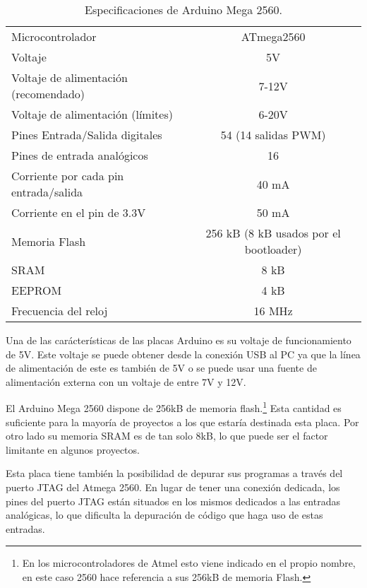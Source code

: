 \begin{table}
\begin{center}
\begin{tabular}{| l | c |}
\hline
Microcontrolador 						& ATmega2560 \\
Voltaje									& 5V \\
Voltaje de alimentación (recomendado) 	& 7-12V \\
Voltaje de alimentación (límites) 		& 6-20V \\
Pines Entrada/Salida digitales			& 54 (14 salidas PWM) \\
Pines de entrada analógicos				& 16 \\
Corriente por cada pin entrada/salida 	& 40 mA \\
Corriente en el pin de 3.3V				& 50 mA \\
Memoria Flash 							& 256 kB (8 kB usados por el bootloader) \\
SRAM									& 8 kB \\
EEPROM									& 4 kB \\
Frecuencia del reloj					& 16 MHz \\
\hline
\end{tabular}
\end{center}
\caption{Especificaciones de Arduino Mega 2560.}
\label{tab:mega2560_specs}
\end{table}
Una de las carácterísticas de las placas Arduino es su voltaje de funcionamiento de 5V. Este voltaje se puede obtener desde la conexión USB al PC ya que la línea de alimentación de este es también de 5V o se puede usar una fuente de alimentación externa con un voltaje de entre 7V y 12V.

El Arduino Mega 2560 dispone de 256kB de memoria flash.\footnote{En los microcontroladores de Atmel esto viene indicado en el propio nombre, en este caso 2560 hace referencia a sus 256kB de memoria Flash.} Esta cantidad es suficiente para la mayoría de proyectos a los que estaría destinada esta placa. Por otro lado su memoria SRAM es de tan solo 8kB, lo que puede ser el factor limitante en algunos proyectos.

Esta placa tiene también la posibilidad de depurar sus programas a través del puerto JTAG del Atmega 2560. En lugar de tener una conexión dedicada, los pines del puerto JTAG están situados en los mismos dedicados a las entradas analógicas, lo que dificulta la depuración de código que haga uso de estas entradas.

